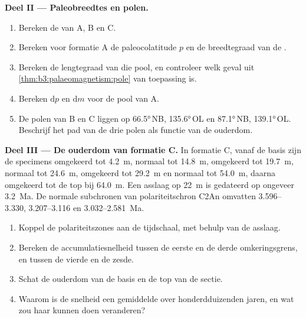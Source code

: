\begin{problem}
\medskip\noindent\textbf{Deel II --- Paleobreedtes en polen.}
\begin{enumerate}[resume]
  \item Bereken de  van A, B en C.
  \item Bereken voor formatie A de paleocolatitude $p$ en de breedtegraad van
        de .
  \item Bereken de lengtegraad van die pool, en controleer welk geval uit
        \cref{thm:b3:palaeomagnetism:pole} van toepassing is.
  \item Bereken $\mathrm dp$ en $\mathrm dm$ voor de pool van A.
  \item De polen van B en C liggen op \ang{66.5}\,NB, \ang{135.6}\,OL en
        \ang{87.1}\,NB, \ang{139.1}\,OL. Beschrijf het pad van de drie polen
        als functie van de ouderdom.
\end{enumerate}

\medskip\noindent\textbf{Deel III --- De ouderdom van formatie C.} In formatie C,
vanaf de basis zijn de specimens omgekeerd tot \qty{4.2}{m}, normaal tot
\qty{14.8}{m}, omgekeerd tot \qty{19.7}{m}, normaal tot \qty{24.6}{m}, omgekeerd tot
\qty{29.2}{m} en normaal tot \qty{54.0}{m}, daarna omgekeerd tot de top bij
\qty{64.0}{m}. Een asslaag op \qty{22}{m} is gedateerd op ongeveer \qty{3.2}{Ma}. De
normale subchronen van polariteitschron C2An omvatten 3.596--3.330, 3.207--3.116 en
3.032--\qty{2.581}{Ma}.
\begin{enumerate}[resume]
  \item Koppel de polariteitszones aan de tijdschaal, met behulp van de asslaag.
  \item Bereken de accumulatiesnelheid tussen de eerste en de derde
        omkeringsgrens, en tussen de vierde en de zesde.
  \item Schat de ouderdom van de basis en de top van de sectie.
  \item Waarom is de snelheid een gemiddelde over honderdduizenden jaren, en wat
        zou haar kunnen doen veranderen?
\end{enumerate}


\end{problem}
